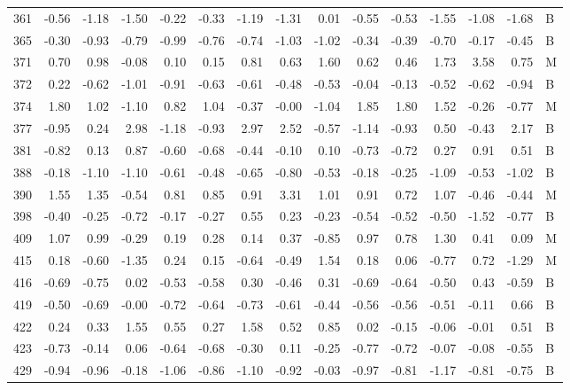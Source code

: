 \begin{table}[ht]
\begin{tabular}{rrrrrrrrrrrrrrl}
  361 & -0.56 & -1.18 & -1.50 & -0.22 & -0.33 & -1.19 & -1.31 & 0.01 & -0.55 & -0.53 & -1.55 & -1.08 & -1.68 & B \\ 
  365 & -0.30 & -0.93 & -0.79 & -0.99 & -0.76 & -0.74 & -1.03 & -1.02 & -0.34 & -0.39 & -0.70 & -0.17 & -0.45 & B \\ 
  371 & 0.70 & 0.98 & -0.08 & 0.10 & 0.15 & 0.81 & 0.63 & 1.60 & 0.62 & 0.46 & 1.73 & 3.58 & 0.75 & M \\ 
  372 & 0.22 & -0.62 & -1.01 & -0.91 & -0.63 & -0.61 & -0.48 & -0.53 & -0.04 & -0.13 & -0.52 & -0.62 & -0.94 & B \\ 
  374 & 1.80 & 1.02 & -1.10 & 0.82 & 1.04 & -0.37 & -0.00 & -1.04 & 1.85 & 1.80 & 1.52 & -0.26 & -0.77 & M \\ 
  377 & -0.95 & 0.24 & 2.98 & -1.18 & -0.93 & 2.97 & 2.52 & -0.57 & -1.14 & -0.93 & 0.50 & -0.43 & 2.17 & B \\ 
  381 & -0.82 & 0.13 & 0.87 & -0.60 & -0.68 & -0.44 & -0.10 & 0.10 & -0.73 & -0.72 & 0.27 & 0.91 & 0.51 & B \\ 
  388 & -0.18 & -1.10 & -1.10 & -0.61 & -0.48 & -0.65 & -0.80 & -0.53 & -0.18 & -0.25 & -1.09 & -0.53 & -1.02 & B \\ 
  390 & 1.55 & 1.35 & -0.54 & 0.81 & 0.85 & 0.91 & 3.31 & 1.01 & 0.91 & 0.72 & 1.07 & -0.46 & -0.44 & M \\ 
  398 & -0.40 & -0.25 & -0.72 & -0.17 & -0.27 & 0.55 & 0.23 & -0.23 & -0.54 & -0.52 & -0.50 & -1.52 & -0.77 & B \\ 
  409 & 1.07 & 0.99 & -0.29 & 0.19 & 0.28 & 0.14 & 0.37 & -0.85 & 0.97 & 0.78 & 1.30 & 0.41 & 0.09 & M \\ 
  415 & 0.18 & -0.60 & -1.35 & 0.24 & 0.15 & -0.64 & -0.49 & 1.54 & 0.18 & 0.06 & -0.77 & 0.72 & -1.29 & M \\ 
  416 & -0.69 & -0.75 & 0.02 & -0.53 & -0.58 & 0.30 & -0.46 & 0.31 & -0.69 & -0.64 & -0.50 & 0.43 & -0.59 & B \\ 
  419 & -0.50 & -0.69 & -0.00 & -0.72 & -0.64 & -0.73 & -0.61 & -0.44 & -0.56 & -0.56 & -0.51 & -0.11 & 0.66 & B \\ 
  422 & 0.24 & 0.33 & 1.55 & 0.55 & 0.27 & 1.58 & 0.52 & 0.85 & 0.02 & -0.15 & -0.06 & -0.01 & 0.51 & B \\ 
  423 & -0.73 & -0.14 & 0.06 & -0.64 & -0.68 & -0.30 & 0.11 & -0.25 & -0.77 & -0.72 & -0.07 & -0.08 & -0.55 & B \\ 
  429 & -0.94 & -0.96 & -0.18 & -1.06 & -0.86 & -1.10 & -0.92 & -0.03 & -0.97 & -0.81 & -1.17 & -0.81 & -0.75 & B \\ 

\end{tabular}
\end{table}
